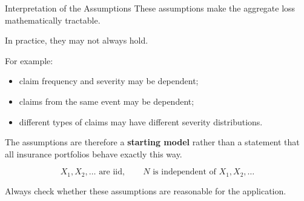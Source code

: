 \documentclass[
  ignorenonframetext,
  aspectratio=169,
]{beamer}
\providecommand{\tightlist}{%
  \setlength{\itemsep}{0pt}\setlength{\parskip}{0pt}}
\begin{document}
\begin{frame}{Interpretation of the Assumptions}
\protect{}\label{interpretation-of-the-assumptions}
These assumptions make the aggregate loss mathematically tractable.

In practice, they may not always hold.

For example:

\begin{itemize}
\tightlist
\item
  claim frequency and severity may be dependent;
\item
  claims from the same event may be dependent;
\item
  different types of claims may have different severity distributions.
\end{itemize}

The assumptions are therefore a \textbf{starting model} rather than a
statement that all insurance portfolios behave exactly this way.

\begin{tcolorbox}[enhanced jigsaw, arc=.35mm, bottomrule=.15mm, bottomtitle=1mm, breakable, colback=white, colbacktitle=quarto-callout-warning-color!10!white, colframe=quarto-callout-warning-color-frame, coltitle=black, left=2mm, leftrule=.75mm, opacityback=0, opacitybacktitle=0.6, rightrule=.15mm, title=\textcolor{quarto-callout-warning-color}{\faExclamationTriangle}\hspace{0.5em}{Modelling assumptions}, titlerule=0mm, toprule=.15mm, toptitle=1mm]

\[
\boxed{
X_1,X_2,\ldots\text{ are iid},
\qquad
N\text{ is independent of }X_1,X_2,\ldots
}
\]

Always check whether these assumptions are reasonable for the
application.

\end{tcolorbox}
\end{frame}
\end{document}
